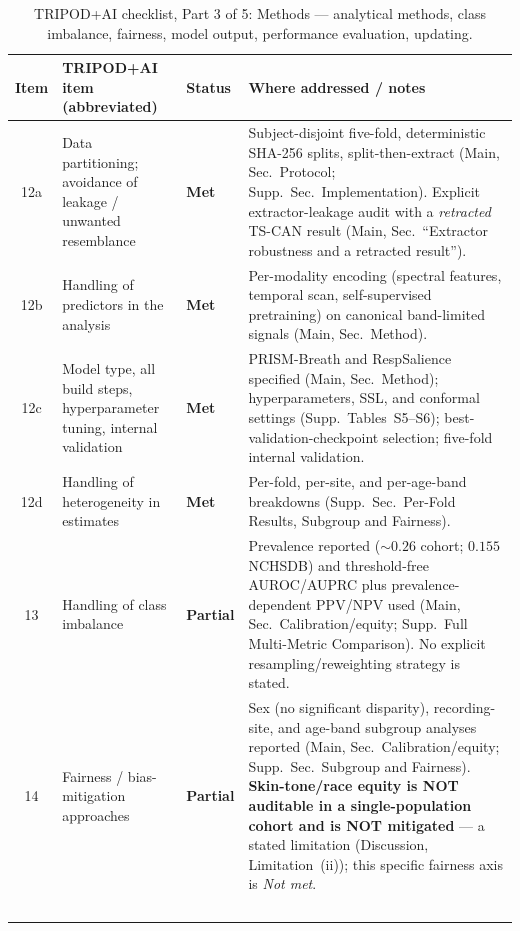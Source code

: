 \begin{table}[!tp]
\caption{TRIPOD+AI checklist, Part 3 of 5: Methods --- analytical methods, class imbalance, fairness, model
output, performance evaluation, updating.}
\label{tab:tripod-c}\centering\footnotesize
\begin{tabular}{@{}c >{\raggedright\arraybackslash}p{1.65in} >{\raggedright\arraybackslash}p{0.70in} >{\raggedright\arraybackslash}p{3.35in}@{}}
\toprule
Item & TRIPOD+AI item (abbreviated) & Status & Where addressed / notes\\\midrule
12a & Data partitioning; avoidance of leakage / unwanted resemblance
    & \textbf{Met}
    & Subject-disjoint five-fold, deterministic SHA-256 splits, split-then-extract (Main, Sec.~Protocol; Supp.~Sec.~Implementation). Explicit extractor-leakage audit with a \emph{retracted} TS-CAN result (Main, Sec.~``Extractor robustness and a retracted result'').\\
12b & Handling of predictors in the analysis
    & \textbf{Met}
    & Per-modality encoding (spectral features, temporal scan, self-supervised pretraining) on canonical band-limited signals (Main, Sec.~Method).\\
12c & Model type, all build steps, hyperparameter tuning, internal validation
    & \textbf{Met}
    & PRISM-Breath and RespSalience specified (Main, Sec.~Method); hyperparameters, SSL, and conformal settings (Supp.~Tables~S5--S6); best-validation-checkpoint selection; five-fold internal validation.\\
12d & Handling of heterogeneity in estimates
    & \textbf{Met}
    & Per-fold, per-site, and per-age-band breakdowns (Supp.~Sec.~Per-Fold Results, Subgroup and Fairness).\\
13  & Handling of class imbalance
    & \textbf{Partial}
    & Prevalence reported ($\sim$$0.26$ cohort; $0.155$ NCHSDB) and threshold-free AUROC/AUPRC plus prevalence-dependent PPV/NPV used (Main, Sec.~Calibration/equity; Supp.~Full Multi-Metric Comparison). No explicit resampling/reweighting strategy is stated.\\
14  & Fairness / bias-mitigation approaches
    & \textbf{Partial}
    & Sex (no significant disparity), recording-site, and age-band subgroup analyses reported (Main, Sec.~Calibration/equity; Supp.~Sec.~Subgroup and Fairness). \textbf{Skin-tone/race equity is NOT auditable in a single-population cohort and is NOT mitigated} --- a stated limitation (Discussion, Limitation~(ii)); this specific fairness axis is \emph{Not met}.\\
$$
\end{tabular}
\end{table}
